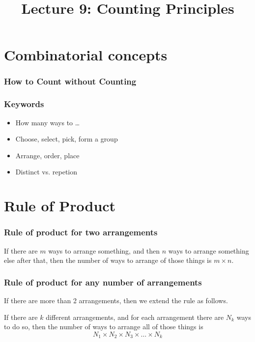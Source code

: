 \title{Lecture 9: Counting Principles}

\frame{\titlepage}

\begin{frame}
\end{frame}

\section[Concept]{Combinatorial concepts}
\frame{\sectionpage}

\begin{frame}
\frametitle{How to Count without Counting}
\end{frame}

\begin{frame}
\frametitle{Keywords}
\begin{itemize}
\item How many ways to \ldots
\item Choose, select, pick, form a group
\item Arrange, order, place
\item Distinct vs. repetion
\end{itemize}
\end{frame}

\section{Rule of Product}
\frame{\sectionpage}

\begin{frame}
\frametitle{Rule of product for two arrangements}
\begin{thm}{}{}
If there are $m$ ways to arrange something, and then $n$ ways to arrange something else after that, then the number of ways to arrange  of those things is $m \times n$.
\end{thm}
\end{frame}

\begin{frame}
\frametitle{Rule of product for any number of arrangements}
If there are more than 2 arrangements, then we extend the rule as follows.
\begin{thm}{}{}
If there are $k$ different arrangements, and for each arrangement there are $N_k$ ways to do so, then the number of ways to arrange all of those things is
\begin{equation} \label{eq:rule_of_product}
 N_1 \times N_2 \times N_3 \times \ldots \times N_k
 \end{equation}
\end{thm}
\end{frame}

